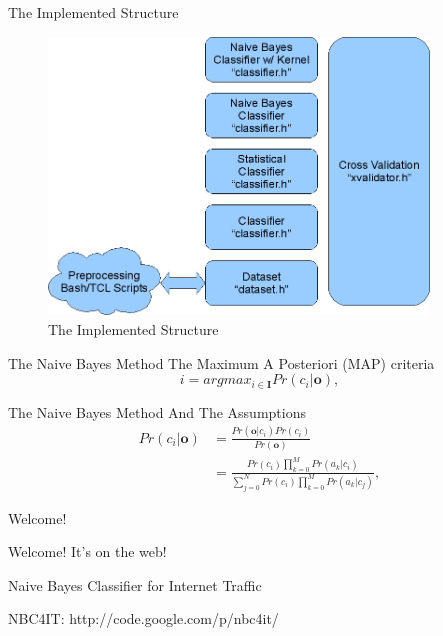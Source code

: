 \documentclass{beamer}
\begin{document}
\begin{frame}{The Implemented Structure}
	\begin{figure}[tbp]
	    \centering
	    \includegraphics[width=0.9\textwidth]{pic/struct.png}
	    \caption{The Implemented Structure}
	    \label{fig:flow_chart}
	\end{figure}
\end{frame}

\begin{frame}{The Naive Bayes Method}
    The Maximum A Posteriori (MAP) criteria
    \begin{equation}
	\label{eq:map}
	i = argmax_{i \in \mathbf{I}} {Pr(c_i|\mathbf{o})},
    \end{equation}

    The Naive Bayes Method And The Assumptions
    \begin{align}
	Pr(c_i|\mathbf{o}) & = \frac{Pr(\mathbf{o}|c_i)Pr(c_i)}{Pr(\mathbf{o})} \\
	& = \frac{ Pr(c_i) \prod_{k=0}^{M} { Pr(a_k|c_i) } } { \sum_{j=0}^{N} {Pr(c_i) \prod_{k=0}^{M}{Pr(a_k|c_j)} }},
    \end{align}
\end{frame}

\begin{frame}{Welcome!}
    \begin{centering}

    Welcome! It's on the web!

    Naive Bayes Classifier for Internet Traffic 
    
    NBC4IT: http://code.google.com/p/nbc4it/

    \end{centering}
\end{frame}
\end{document}
